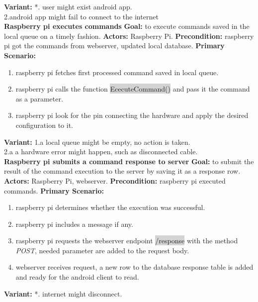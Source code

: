 \documentclass[12pt, oneside, a4paper]{book}
\newcommand{\code}[1]{{\color{red}\colorbox{lightgray}{#1}}}
\newcommand\boldcolor[1]{\textcolor{bold}{\textbf{#1}}}
\begin{document}
				\textbf{Variant:}\newline
				\hspace*{5mm}*. user might exist android app. \\
				\hspace*{5mm}2.android app might fail to connect to the internet \\
				\newline\boldcolor{Raspberry pi executes commands}
				\newline\textbf{Goal:} to execute commands saved in the local queue on a timely fashion.
				\newline\textbf{Actors:} Raspberry Pi.	
				\newline\textbf{Precondition:} raspberry pi got the commands from webserver, updated local database.
				\newline\textbf{Primary Scenario:}	
				\begin{enumerate}[label*=\arabic*.]
					\item raspberry pi fetches first processed command saved in local queue.
					\item raspberry pi calls the function \code{EcecuteCommand()} and pass it the command as a parameter.
					\item raspberry pi look for the pin connecting the hardware and apply the desired configuration to it.
				\end{enumerate}
				\textbf{Variant:}\newline	
				\hspace*{5mm}1.a local queue might be empty, no action is taken. \\
				\hspace*{5mm}2.a a hardware error might happen, such as disconnected cable. \\
				\newline\boldcolor{Raspberry pi submits a command response to server}
				\newline\textbf{Goal:} to submit the result of the command execution to the server by saving it as a response row.
				\newline\textbf{Actors:} Raspberry Pi, webserver.
				\newline\textbf{Precondition:} raspberry pi executed commands.
				\newline\textbf{Primary Scenario:}	
				\begin{enumerate}[label*=\arabic*.]
					\item raspberry pi determines whether the execution was successful. 
					\item raspberry pi includes a message if any.
					\item  raspberry pi requests the webserver endpoint \code{/response} with the method \textit{POST}, needed parameter are added to the request body.
					\item webserver receives request, a new row to the database response table is added and ready for the android client to read. 
				 
				\end{enumerate}
				\textbf{Variant:}\newline	
				\hspace*{5mm}*. internet might disconnect.
					
\end{document}
